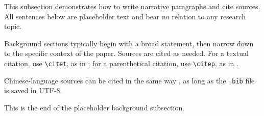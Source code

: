 
This subsection demonstrates how to write narrative paragraphs and cite
sources. All sentences below are placeholder text and bear no relation to
any research topic.

Background sections typically begin with a broad statement, then narrow down
to the specific context of the paper. Sources are cited as needed. For a
textual citation, use \texttt{\textbackslash citet}, as in
\citet{author2018book}; for a parenthetical citation, use
\texttt{\textbackslash citep}, as in \citep{author2020example}.

Chinese-language sources can be cited in the same way \citep{zhang2018example},
as long as the \texttt{.bib} file is saved in UTF-8.

This is the end of the placeholder background subsection.
